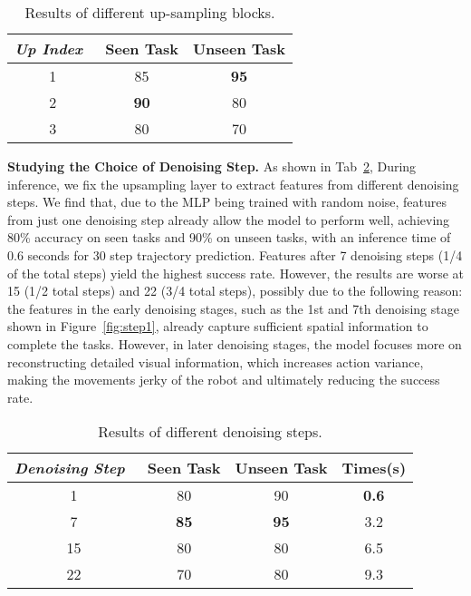 \begin{table}[h]
 \small
  \centering
  \begin{tabular}{ccc}
    \toprule
    {\it Up Index}~&Seen Task  &Unseen Task\\
    \midrule
    1 &85 &{\bf 95} \\
    2 &{\bf90} &80\\
    3 &80 &70\\
    \bottomrule
  \end{tabular}
  \vspace{-0.4em}
  \caption{Results of different up-sampling blocks.}
  \label{tab:upsample}
  \vspace{-1.2em}
\end{table}



\noindent\textbf{Studying the Choice of Denoising Step.}
As shown in Tab~\ref{tab:denosing}, During inference, we fix the upsampling layer to extract features from different denoising steps. We find that, due to the MLP being trained with random noise, features from just one denoising step already allow the model to perform well, achieving 80\% accuracy on seen tasks and 90\% on unseen tasks, with an inference time of 0.6 seconds for 30 step trajectory prediction. Features after 7 denoising steps (1/4 of the total steps) yield the highest success rate. However, the results are worse at 15 (1/2 total steps) and 22 (3/4 total steps), possibly due to the following reason: the features in the early denoising stages, such as the 1st and 7th denoising stage shown in Figure~\ref{fig:step1}, already capture sufficient spatial information to complete the tasks. However, in later denoising stages, the model focuses more on reconstructing detailed visual information, which increases action variance, making the movements jerky of the robot and ultimately reducing the success rate.

\begin{table}[ht]
 \small
  \centering
  \begin{tabular}{cccc}
    \toprule
    {\it Denoising Step}~&Seen Task &Unseen Task & Times(s) \\
    \midrule
    1 &80 &90 & {\bf0.6}\\
    7 &{\bf 85} &{\bf95} & 3.2\\
    15 &80 &80 & 6.5\\
    22 & 70 &80  & 9.3\\
    \bottomrule
  \end{tabular}
  \vspace{-0.4em}
  \caption{Results of different denoising steps.}
  \label{tab:denosing}
  \vspace{-1.6em}
\end{table}

